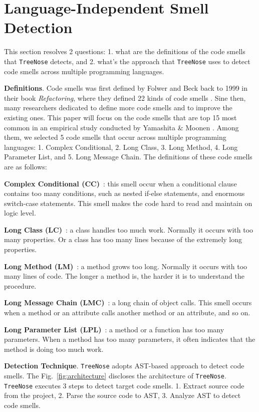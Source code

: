 \section{Language-Independent Smell Detection}

This section resolves 2 questions: 1. what are the definitions of the code
smells that \texttt{TreeNose} detects, and 2. what's the approach that
\texttt{TreeNose} uses to detect code smells across multiple programming
languages.

{\bf Definitions}. Code smells was first defined by Folwer and Beck back to 1999
in their book \textit{Refactoring}, where they defined 22 kinds of code smells
\cite{Fowler_Beck}. Sine then, many researchers dedicated to define more code
smells and to improve the existing ones. This paper will focus on the code
smells that are top 15 most common in an empirical study conducted by Yamashita
\& Moonen \cite{developersCare}. Among them, we selected 5 code smells that
occur across multiple programming languages: 1. Complex Conditional, 2. Long
Class, 3. Long Method, 4. Long Parameter List, and 5. Long Message Chain. The
definitions of these code smells are as follows:

\textbf{Complex Conditional (CC)}~\cite{Fowler_Beck}: this smell occur when a
conditional clause contains too many conditions, such as nested if-else
statements, and enormous switch-case statements. This smell makes the code hard
to read and maintain on logic level.

\textbf{Long Class (LC)}~\cite{Fowler_Beck}: a class handles too much work.
Normally it occurs with too many properties. Or a class has too many lines
because of the extremely long properties.

\textbf{Long Method (LM)}~\cite{Fowler_Beck}: a method grows too long. Normally
it occurs with too many lines of code. The longer a method is, the harder it is
to understand the procedure.

\textbf{Long Message Chain (LMC)}~\cite{Fowler_Beck}: a long chain of object
calls. This smell occurs when a method or an attribute calls another method or
an attribute, and so on.

\textbf{Long Parameter List (LPL)}~\cite{Fowler_Beck}: a method or a function
has too many parameters. When a method has too many parameters, it often
indicates that the method is doing too much work.



{\bf Detection Technique}. \texttt{TreeNose} adopts AST-based approach to detect
code smells. The Fig.~\ref{fig:architecture} discloses the architecture of
\texttt{TreeNose}. \texttt{TreeNose} executes 3 steps to detect target code
smells. 1. Extract source code from the project, 2. Parse the source code to
AST, 3. Analyze AST to detect code smells.

